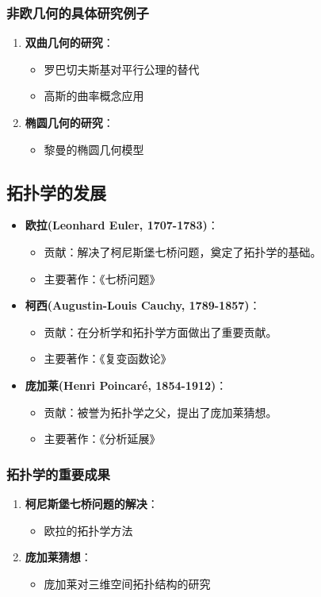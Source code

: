 \documentclass{Math_Note}
\begin{document}
\subsubsection*{非欧几何的具体研究例子}
\begin{enumerate}
    \item \textbf{双曲几何的研究}：
    \begin{itemize}
        \item 罗巴切夫斯基对平行公理的替代
        \item 高斯的曲率概念应用
    \end{itemize}
    \item \textbf{椭圆几何的研究}：
    \begin{itemize}
        \item 黎曼的椭圆几何模型
    \end{itemize}
\end{enumerate}

\subsection{拓扑学的发展}
\begin{itemize}
    \item \textbf{欧拉(Leonhard Euler, 1707-1783)}：
    \begin{itemize}
        \item 贡献：解决了柯尼斯堡七桥问题，奠定了拓扑学的基础。
        \item 主要著作：《七桥问题》
    \end{itemize}
    
    \item \textbf{柯西(Augustin-Louis Cauchy, 1789-1857)}：
    \begin{itemize}
        \item 贡献：在分析学和拓扑学方面做出了重要贡献。
        \item 主要著作：《复变函数论》
    \end{itemize}
    
    \item \textbf{庞加莱(Henri Poincaré, 1854-1912)}：
    \begin{itemize}
        \item 贡献：被誉为拓扑学之父，提出了庞加莱猜想。
        \item 主要著作：《分析延展》
    \end{itemize}
\end{itemize}

\subsubsection*{拓扑学的重要成果}
\begin{enumerate}
    \item \textbf{柯尼斯堡七桥问题的解决}：
    \begin{itemize}
        \item 欧拉的拓扑学方法
    \end{itemize}
    \item \textbf{庞加莱猜想}：
    \begin{itemize}
        \item 庞加莱对三维空间拓扑结构的研究
    \end{itemize}
\end{enumerate}
\end{document}
